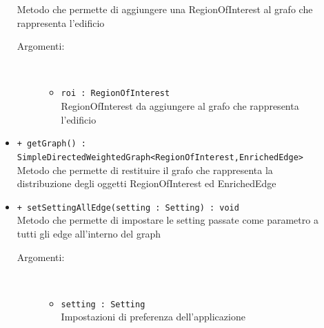 \documentclass[../DefinizioneDiProdotto.tex]{subfiles}
\begin{document}
\begin{description}
\begin{itemize}
		Metodo che permette di aggiungere una RegionOfInterest al grafo che rappresenta l'edificio
		\begin{description}
			\item[Argomenti:] \
			\begin{itemize}
				\item \texttt{roi : RegionOfInterest}\\
				RegionOfInterest da aggiungere al grafo che rappresenta l'edificio\end{itemize}
		\end{description}
		\item \texttt{+ getGraph() : SimpleDirectedWeightedGraph<RegionOfInterest,EnrichedEdge>}\\
		Metodo che permette di restituire il grafo che rappresenta la distribuzione degli oggetti RegionOfInterest ed EnrichedEdge
		\item \texttt{+ setSettingAllEdge(setting : Setting) : void}\\
		Metodo che permette di impostare le setting passate come parametro a tutti gli edge all'interno del graph
		\begin{description}
			\item[Argomenti:] \
			\begin{itemize}
				\item \texttt{setting : Setting}\\
				Impostazioni di preferenza dell'applicazione\end{itemize}
		\end{description}
	\end{itemize}
\end{description}
\end{document}
